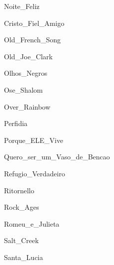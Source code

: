 \documentclass{article}
\begin{document}

{Noite_Feliz}


{Cristo_Fiel_Amigo}

    
{Old_French_Song}

 
{Old_Joe_Clark}


{Olhos_Negros}


{Ose_Shalom}


{Over_Rainbow}


{Perfidia}


{Porque_ELE_Vive}


{Quero_ser_um_Vaso_de_Bencao}


{Refugio_Verdadeiro}


{Ritornello}


{Rock_Ages}


{Romeu_e_Julieta}


{Salt_Creek}


{Santa_Lucia}
\end{document}
